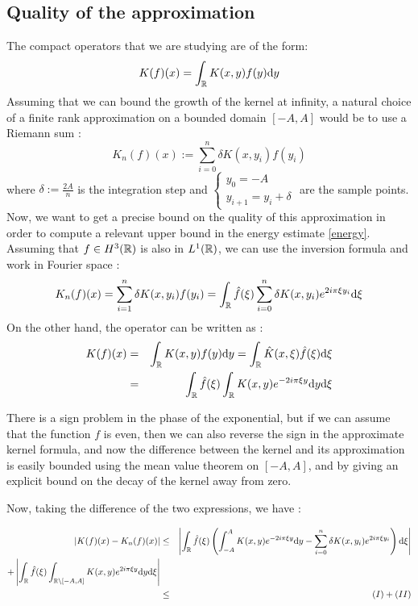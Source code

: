 \documentclass[11pt,a4paper]{article}
\begin{document}
\newpage

\subsection{Quality of the approximation}
The compact operators that we are studying are of the form: \[K(f)(x) = \int_\mathbb R K(x,y)f(y)\mathrm{d}y \]
Assuming that we can bound the growth of the kernel at infinity, a natural choice of a finite rank approximation on a bounded domain $[-A,A]$ would be to use a Riemann sum : \[K_n(f)(x) := \sum_{i=0}^n \delta K(x,y_i)f(y_i)\]
where $\delta := \frac{2A}{n}$ is the integration step and $\begin{cases} y_0=-A \\ y_{i+1}=y_i + \delta \end{cases}$ are the sample points. \\

Now, we want to get a precise bound on the quality of this approximation in order to compute a relevant upper bound in the energy estimate \ref{energy}. \\
Assuming that $f\in H^3(\mathbb R)$ is also in $L^1(\mathbb R)$, we can use the inversion formula and work in Fourier space :
\begin{equation}\label{int_finite}
K_n(f)(x) =  \sum_{i=1}^n\delta K(x,y_i)f(y_i) = \int_\mathbb R \hat{f}(\xi)\sum_{i=0}^n \delta K(x,y_i) e^{2i\pi\xi y_i}\mathrm{d}\xi
\end{equation}
On the other hand, the operator can be written as :
\begin{eqnarray*}
K(f)(x) &=& \int_\mathbb R K(x,y)f(y)\mathrm{d}y = \int_\mathbb R \hat{K}(x,\xi)\hat{f}(\xi)\mathrm{d}\xi \\
&=& \int_\mathbb R \hat{f}(\xi) \int_\mathbb R K(x,y)e^{-2i\pi\xi y}\mathrm{d}y \mathrm{d}\xi 
\end{eqnarray*}

There is a sign problem in the phase of the exponential, but if we can assume that the function $f$ is even, then we can also reverse the sign in the approximate kernel formula, and now the difference between the kernel and its approximation is easily bounded using the mean value theorem on $[-A,A]$, and by giving an explicit bound on the decay of the kernel away from zero. 

Now, taking the difference of the two expressions, we have :

\begin{eqnarray*}
\left| K(f)(x) - K_n(f)(x)\right| &\leq& \left|  \int_\mathbb R \hat{f}(\xi) \left(\int_{-A}^A K(x,y)e^{-2i\pi\xi y}\mathrm{d}y - \sum_{i=0}^n \delta K(x,y_i) e^{2i\pi\xi y_i} \right)\mathrm{d}\xi \right| \\ + \left|\int_\mathbb R \hat{f}(\xi) \int_{\mathbb R \setminus [-A,A]} K(x,y)e^{2i\pi\xi y}\mathrm{d}y\mathrm{d}\xi \right| \\
&\leq& (I) + (II)
\end{eqnarray*}
\end{document}
